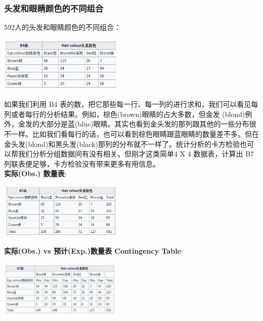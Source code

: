 \hypertarget{ux5934ux53d1ux548cux773cux775bux989cux8272ux7684ux4e0dux540cux7ec4ux5408}{%
\subsubsection{头发和眼睛颜色的不同组合}\label{ux5934ux53d1ux548cux773cux775bux989cux8272ux7684ux4e0dux540cux7ec4ux5408}}

592人的头发和眼睛颜色的不同组合：

\includegraphics[width=6cm]{Screenshotfrom2023-01-0222-19-18.png}

如果我们利用 B4
表的数，把它那些每一行、每一列的进行求和，我们可以看见每列或者每行的分析结果。例如，棕色(brown)眼睛的占大多数，但金发
(blond)例外，金发的大部分是蓝(blue)眼睛。其实也看到金头发的那列跟其他的一些分布很不一样。比如我们看每行的话，也可以看到棕色眼睛跟蓝眼睛的数量差不多。但在金头发(blond)和黑头发(black)那列的分布就不一样了。统计分析的卡方检验也可以帮我们分析分组数据间有没有相关。但刚才这类简单4
X 4 数据表，计算出 B7 列联表便足够，卡方检验没有带来更多有用信息。\\
\textbf{实际(Obs.) 数量表}:

\includegraphics[width=6cm]{Screenshotfrom2023-01-0222-20-05.png}


\textbf{实际(Obs.) vs 预计(Exp.)数量表 Contingency Table}:

\includegraphics[width=6cm]{Screenshotfrom2023-01-0222-21-11.png}

\begin{description}
\item[]
\end{description}

